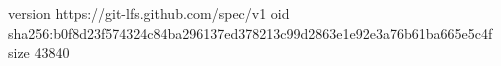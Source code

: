 version https://git-lfs.github.com/spec/v1
oid sha256:b0f8d23f574324c84ba296137ed378213c99d2863e1e92e3a76b61ba665e5c4f
size 43840
